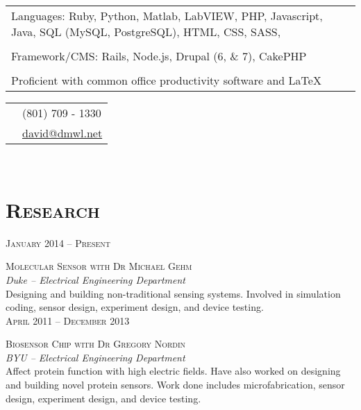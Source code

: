 \documentclass[10pt]{article}
\begin{document}
{\begin{minipage}[t]{0.5\textwidth}
	\begin{tabular}{p{8cm}}
      Languages: Ruby, Python, Matlab, LabVIEW, PHP, Javascript, Java, SQL (MySQL, PostgreSQL), HTML, CSS, SASS, \\\\
    Framework/CMS: Rails, Node.js, Drupal (6, \& 7), CakePHP\\\\
    Proficient with common office productivity software and \LaTeX{}\\
	\end{tabular}
	
\end{minipage} %
\hfill
\begin{minipage}[t]{0.44\textwidth} %
	
	\vspace{0pt} %
	
\colorbox{shade}{\textcolor{text1}{
	\begin{tabular}{c|p{7cm}}
		\raisebox{-3pt}{\Phone}  		&(801) 709 - 1330\\
		\raisebox{-3pt}{\Envelope} 	&\href{mailto:david@dmwl.net}
								{david@dmwl.net}
	\end{tabular}
	}
}\\[10pt]

\section{\textsc{Research}}

	\raggedleft
	\textsc{\normalsize January 2014 -- Present}\par

	\raggedright\large \textsc{Molecular Sensor with Dr Michael Gehm }\\
  \emph{Duke -- Electrical Engineering Department}\\[5pt]
  \normalsize{%
    Designing and building non-traditional sensing systems.
    Involved in simulation coding, sensor design, experiment design, and device testing.
  }\\[10pt]

	\raggedleft
	\textsc{\normalsize April 2011 -- December 2013}\par

	\raggedright\large \textsc{Biosensor Chip with Dr Gregory Nordin}\\
  \emph{BYU -- Electrical Engineering Department}\\[5pt]
  \normalsize{%
    Affect protein function with high electric fields.
    Have also worked on designing and building novel protein sensors.
    Work done includes microfabrication, sensor design, experiment design, and device testing.
  }\\[10pt]


\end{minipage}}
\end{document}

